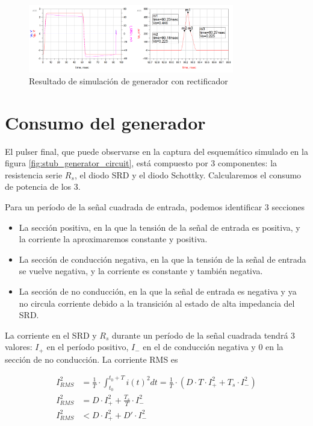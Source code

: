 \begin{figure}[tbp]
    \centering
    \includegraphics[width=0.8\textwidth]{images/pulser_w_schottky_sim_result.png}
    \caption{Resultado de simulación de generador con rectificador}
    \label{fig:pulser_w_schottky_sim_result}
\end{figure}

\section{Consumo del generador}
\label{sec:pulser_power}

El pulser final, que puede observarse en la captura del esquemático simulado en
la figura \ref{fig:stub_generator_circuit}, está compuesto por 3 componentes: la
resistencia serie $R_s$, el diodo SRD y el diodo Schottky. Calcularemos el
consumo de potencia de los 3.

Para un período de la señal cuadrada de entrada, podemos identificar 3 secciones

\begin{itemize}
    \item La sección positiva, en la que la tensión de la señal de entrada es
        positiva, y la corriente la aproximaremos constante y positiva.
    \item La sección de conducción negativa, en la que la tensión de la señal de
        entrada se vuelve negativa, y la corriente es constante y también
        negativa.
    \item La sección de no conducción, en la que la señal de entrada es
        negativa y ya no circula corriente debido a la transición al estado de
        alta impedancia del SRD.
\end{itemize}

La corriente en el SRD y $R_s$ durante un período de la señal cuadrada tendrá 3
valores: $I_+$ en el período positivo, $I_-$ en el de conducción negativa y $0$
en la sección de no conducción. La corriente RMS es

\begin{equation}
    \begin{aligned}
        I_{RMS}^2 &= \frac{1}{T} \cdot \int_{t_0}^{t_0+T} i(t)^2dt = \frac{1}{T}
        \cdot \left( D \cdot T \cdot I_+^2 + T_s \cdot I_-^2 \right) \\
        I_{RMS}^2 &= D \cdot I_+^2 + \frac{T_s}{T} \cdot I_-^2 \\
        I_{RMS}^2 &< D \cdot I_+^2 + D' \cdot I_-^2 \\
    \end{aligned}
\end{equation}

